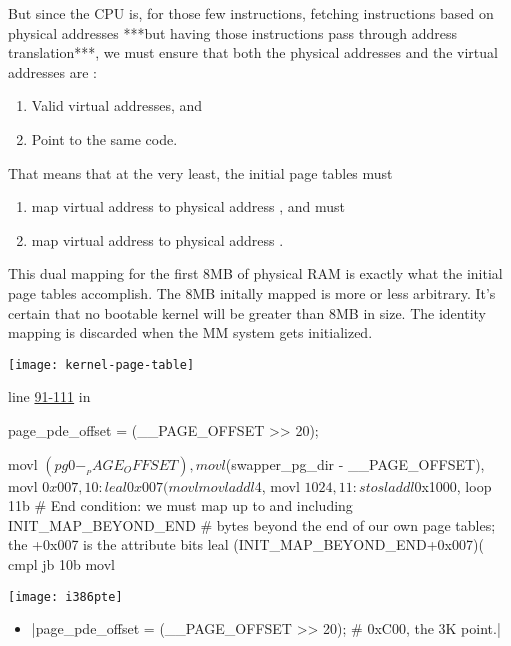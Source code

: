 \begin{itemize}
\begin{itemize}
\begin{description}
      But since the CPU is, for those few instructions, fetching instructions based on
      physical addresses ***but having those instructions pass through address
      translation***, we must ensure that both the physical addresses and the virtual
      addresses are :
      \begin{enumerate}
      \item Valid virtual addresses, and
      \item Point to the same code.
      \end{enumerate}
      That means that at the very least, the initial page tables must
      \begin{enumerate}
      \item map virtual address  to physical address
        , and must
      \item map virtual address  to physical address .
      \end{enumerate}
      This dual mapping for the first 8MB of physical RAM is exactly what the initial page
      tables accomplish. The 8MB initally mapped is more or less arbitrary. It's certain
      that no bootable kernel will be greater than 8MB in size. The identity mapping is
      discarded when the MM system gets initialized.
    \end{description}
  \end{itemize}
  \begin{center}
    \texttt{[image: kernel-page-table]}
  \end{center}
  line \href{http://lxr.linux.no/linux+v2.6.11/arch/i386/kernel/head.S#L91}{91-111} in
    \begin{gascode}
page_pde_offset = (__PAGE_OFFSET >> 20);

        movl $(pg0 - __PAGE_OFFSET), %
        movl $(swapper_pg_dir - __PAGE_OFFSET), %
        movl $0x007, %
10:
        leal 0x007(%
        movl %
        movl %
        addl $4,%
        movl $1024, %
11:
        stosl
        addl $0x1000,%
        loop 11b
        # End condition: we must map up to and including INIT_MAP_BEYOND_END 
        # bytes beyond the end of our own page tables; the +0x007 is the attribute bits 
        leal (INIT_MAP_BEYOND_END+0x007)(%
        cmpl %
        jb 10b
        movl %
      \end{gascode}
    \begin{center}
      \texttt{[image: i386pte]}
    \end{center}
    \begin{itemize}
    \item {}|page_pde_offset = (__PAGE_OFFSET >> 20); # 0xC00, the 3K point.|


\end{itemize}
\end{itemize}
